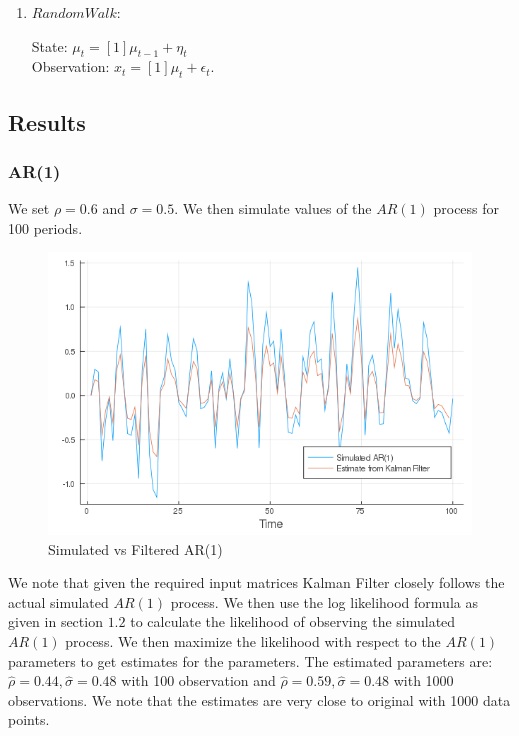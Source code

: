 \documentclass[12pt]{article}
\begin{document}
\begin{enumerate}
\item $Random Walk:$

State: \hspace{4mm} $\mu_t = [1]\mu_{t-1} + \eta_t$ \\
Observation: $x_t = [1]\mu_t + \epsilon_t.$

\end{enumerate}

\newpage
\subsection{Results}

\subsubsection{AR(1)}
We set $\rho = 0.6$ and $\sigma = 0.5$. We then simulate values of the $AR(1)$ process for 100 periods. 

\begin{figure}[h]
\centering
\includegraphics[scale=0.4]{AR1.png}
\caption{Simulated vs Filtered AR(1)}
\end{figure}

We note that given the required input matrices Kalman Filter closely follows the actual simulated $AR(1)$ process. We then use the log likelihood formula as given in section $1.2$ to calculate the likelihood of observing the simulated $AR(1)$ process. We then maximize the likelihood with respect to the $AR(1)$ parameters to get estimates for the parameters. The estimated parameters are:
$\hat{\rho} = 0.44, \hat{\sigma} = 0.48$ with 100 observation and $\hat{\rho} = 0.59, \hat{\sigma} = 0.48$ with 1000 observations. We note that the estimates are very close to original with 1000 data points. 
\end{document}
